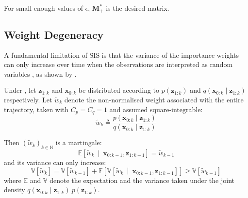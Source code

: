For small enough values of $\epsilon$, $\mathbf{M}_+^*$ is the desired matrix.

\subsection{Weight Degeneracy}

A fundamental limitation of SIS is that the variance of the importance weights can only increase over time when the observations are interpreted as random variables \cite{bib:sequential-imputations}, as shown by .

\begin{proposition}\label{th:variance_weights}
	Under , let $\mathbf{z}_{1:k}$ and $\mathbf{x}_{0:k}$ be distributed according to $p(\mathbf{z}_{1:k})$ and $q(\mathbf{x}_{0:k}\mid\mathbf{z}_{1:k})$ respectively. Let $\tilde{w}_k$ denote the non-normalised weight associated with the entire trajectory, taken with $C_p=C_q=1$ and assumed square-integrable:
	\begin{equation}
		\tilde{w}_k\triangleq\frac{p(\mathbf{x}_{0:k}\mid\mathbf{z}_{1:k})}{q(\mathbf{x}_{0:k}\mid\mathbf{z}_{1:k})}
	\end{equation}

	Then $(\tilde{w}_k)_{k\in\mathbb{N}}$ is a martingale:
	\begin{equation}
		\mathbb{E}\left[\tilde{w}_k\:\middle|\:\mathbf{x}_{0:k-1},\mathbf{z}_{1:k-1}\right]=\tilde{w}_{k-1}
	\end{equation}
	and its variance can only increase:
	\begin{equation}
		\mathbb{V}\left[\tilde{w}_k\right]=\mathbb{V}\left[\tilde{w}_{k-1}\right]+\mathbb{E}\left[\mathbb{V}\left[\tilde{w}_k\:\middle|\:\mathbf{x}_{0:k-1},\mathbf{z}_{1:k-1}\right]\right]\geq\mathbb{V}\left[\tilde{w}_{k-1}\right]\label{eq:weight_variance}
	\end{equation}
	where $\mathbb{E}$ and $\mathbb{V}$ denote the expectation and the variance taken under the joint density $q(\mathbf{x}_{0:k}\mid\mathbf{z}_{1:k})\:p(\mathbf{z}_{1:k})$.
\end{proposition}

